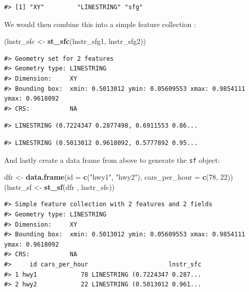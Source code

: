\documentclass[
]{book}
\newenvironment{Shaded}{\begin{snugshade}}{\end{snugshade}}
\newcommand{\AttributeTok}[1]{\textcolor[rgb]{0.13,0.29,0.53}{#1}}
\newcommand{\DecValTok}[1]{\textcolor[rgb]{0.00,0.00,0.81}{#1}}
\newcommand{\FunctionTok}[1]{\textcolor[rgb]{0.13,0.29,0.53}{\textbf{#1}}}
\newcommand{\NormalTok}[1]{#1}
\newcommand{\OtherTok}[1]{\textcolor[rgb]{0.56,0.35,0.01}{#1}}
\newcommand{\StringTok}[1]{\textcolor[rgb]{0.31,0.60,0.02}{#1}}
\begin{document}
\begin{verbatim}
#> [1] "XY"         "LINESTRING" "sfg"
\end{verbatim}

We would then combine this into a simple feature collection :

\begin{Shaded}
\begin{Highlighting}[]
\NormalTok{(lnstr\_sfc }\OtherTok{\textless{}{-}} \FunctionTok{st\_sfc}\NormalTok{(lnstr\_sfg1, lnstr\_sfg2)) }
\end{Highlighting}
\end{Shaded}

\begin{verbatim}
#> Geometry set for 2 features 
#> Geometry type: LINESTRING
#> Dimension:     XY
#> Bounding box:  xmin: 0.5013012 ymin: 0.05609553 xmax: 0.9854111 ymax: 0.9618092
#> CRS:           NA
\end{verbatim}

\begin{verbatim}
#> LINESTRING (0.7224347 0.2877498, 0.6911553 0.86...
\end{verbatim}

\begin{verbatim}
#> LINESTRING (0.5013012 0.9618092, 0.5777892 0.95...
\end{verbatim}

And lastly create a data frame from above to generate the \texttt{sf} object:

\begin{Shaded}
\begin{Highlighting}[]
\NormalTok{dfr }\OtherTok{\textless{}{-}} \FunctionTok{data.frame}\NormalTok{(}\AttributeTok{id =} \FunctionTok{c}\NormalTok{(}\StringTok{"hwy1"}\NormalTok{, }\StringTok{"hwy2"}\NormalTok{), }
                  \AttributeTok{cars\_per\_hour =} \FunctionTok{c}\NormalTok{(}\DecValTok{78}\NormalTok{, }\DecValTok{22}\NormalTok{))}
\NormalTok{(lnstr\_sf }\OtherTok{\textless{}{-}} \FunctionTok{st\_sf}\NormalTok{(dfr , lnstr\_sfc))}
\end{Highlighting}
\end{Shaded}

\begin{verbatim}
#> Simple feature collection with 2 features and 2 fields
#> Geometry type: LINESTRING
#> Dimension:     XY
#> Bounding box:  xmin: 0.5013012 ymin: 0.05609553 xmax: 0.9854111 ymax: 0.9618092
#> CRS:           NA
#>     id cars_per_hour                      lnstr_sfc
#> 1 hwy1            78 LINESTRING (0.7224347 0.287...
#> 2 hwy2            22 LINESTRING (0.5013012 0.961...
\end{verbatim}
\end{document}
